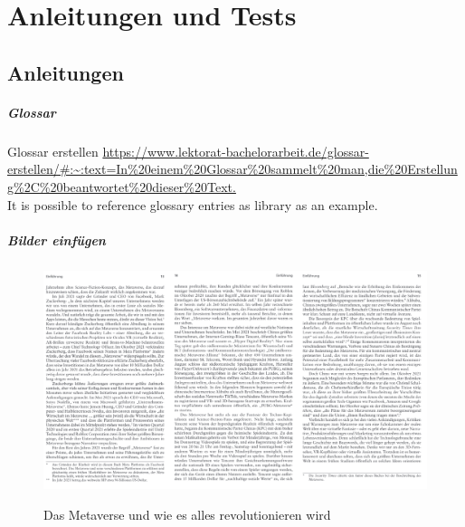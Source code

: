 \chapter{Anleitungen und Tests}\label{ch:Anleitungen}

\section{Anleitungen}

\paragraph*{Glossar}

Glossar erstellen \url{https://www.lektorat-bachelorarbeit.de/glossar-erstellen/#:~:text=In%20einem%20Glossar%20sammelt%20man,die%20Erstellung%2C%20beantwortet%20dieser%20Text.} \\
It is possible to reference glossary entries as \gls{library} as an example.\\

\paragraph*{Bilder einfügen}

\begin{figure}[h]
    \centering
    \includegraphics*{figures/Das_Metaverse_uwearw13-15.png}
    \caption{Das Metaverse und wie es alles revolutionieren wird}
    \label{fig:meine-grafik}
    \cite{Ball22}
    \end{figure}



